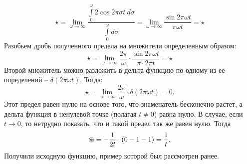 		\[ 
			\star 
				= \lim_{\omega \to \infty} \frac{
					\displaystyle \int\limits_{0}^{\omega} 2 \cos{2 \pi \sigma t ~ d \sigma}
				}{
					\displaystyle \int\limits_{0}^{\omega} d \sigma
				} 
				= \lim_{\omega \to \infty} \frac{\sin{2 \pi \omega t}}{\pi \omega t} 
				= \star 
		\]
		Разобьем дробь полученного предела на множители определенным образом:
		\[ 
			\star 
				= \lim_{\omega \to \infty} \frac{2 \pi}{\omega} \cdot \frac{\sin{2 \pi \omega t}}{\pi \cdot 2 \pi t} 
				= \star 
		\]
		Второй множитель можно разложить в дельта-функцию по одному из ее определений -- $\delta(2 \pi \omega t)$. Тогда:
		\[ \star = \lim_{\omega \to \infty} \frac{2 \pi}{\omega} \cdot \delta(2 \pi \omega t) = 0. \]
		Этот предел равен нулю на основе того, что знаменатель бесконечно растет, а дельта функция в ненулевой точке (полагая $t \neq 0$) равна нулю. В случае, если $t \to 0$, то нетрудно показать, что и такой предел так же равен нулю. Тогда
		\[ \circledast = -\frac{1}{2t} \cdot \left( 0 - 1 - 1 \right) = \frac{1}{t}. \]
		Получили исходную функцию, пример которой был рассмотрен ранее.

